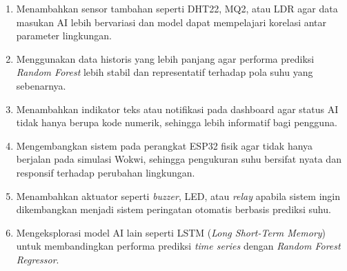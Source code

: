 \begin{enumerate}
    \item Menambahkan sensor tambahan seperti DHT22, MQ2, atau LDR agar data
    masukan AI lebih bervariasi dan model dapat mempelajari korelasi antar
    parameter lingkungan.
    \item Menggunakan data historis yang lebih panjang agar performa prediksi
    \textit{Random Forest} lebih stabil dan representatif terhadap pola suhu
    yang sebenarnya.
    \item Menambahkan indikator teks atau notifikasi pada dashboard agar
    status AI tidak hanya berupa kode numerik, sehingga lebih informatif
    bagi pengguna.
    \item Mengembangkan sistem pada perangkat ESP32 fisik agar tidak hanya
    berjalan pada simulasi Wokwi, sehingga pengukuran suhu bersifat nyata
    dan responsif terhadap perubahan lingkungan.
    \item Menambahkan aktuator seperti \textit{buzzer}, LED, atau \textit{relay}
    apabila sistem ingin dikembangkan menjadi sistem peringatan otomatis
    berbasis prediksi suhu.
    \item Mengeksplorasi model AI lain seperti LSTM (\textit{Long Short-Term
    Memory}) untuk membandingkan performa prediksi \textit{time series}
    dengan \textit{Random Forest Regressor}.
\end{enumerate}
